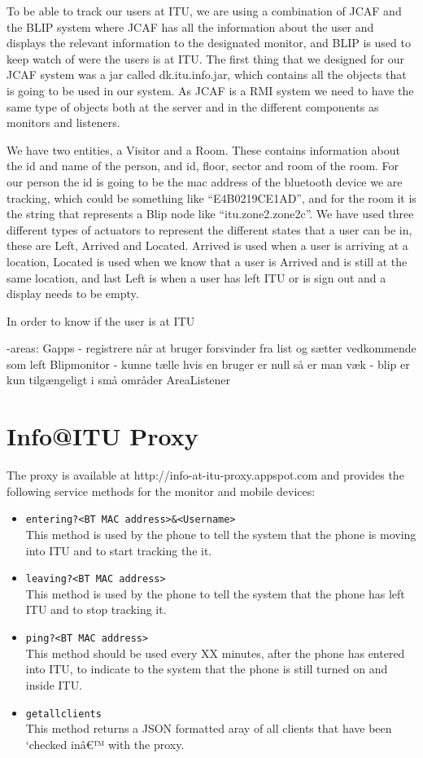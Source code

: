\documentclass{ubicomp2011}
\begin{document}
To be able to track our users at ITU, we are using a combination of JCAF and the BLIP system where JCAF has all the information about the user and displays the relevant information to the designated monitor, and BLIP is used to keep watch of were the users is at ITU.
The first thing that we designed for our JCAF system was a jar called dk.itu.info.jar, which contains all the objects that is going to be used in our system. As JCAF is a RMI system we need to have the same type of objects both at the server and in the different components as monitors and listeners.

We have two entities, a Visitor and a Room. These contains information about the id and name of the person, and id, floor, sector and room of the room. For our person the id is going to be the mac address of the bluetooth device we are tracking, which could be something like “E4B0219CE1AD”, and for the room it is the string that represents a Blip node like “itu.zone2.zone2c”.
We have used three different types of actuators to represent the different states that a user can be in, these are Left, Arrived and Located. Arrived is used when a user is arriving at a location, Located is used when we know that a user is Arrived and is still at the same location, and last Left is when a user has left ITU or is sign out and a display needs to be empty.

In order to know if the user is at ITU

-areas:
Gapps
- registrere når at bruger forsvinder fra list og sætter vedkommende som left
Blipmonitor
- kunne tælle hvis en bruger er null så er man væk
- blip er kun tilgængeligt i små områder
AreaListener
\section{Info@ITU Proxy}

The proxy is available at http://info-at-itu-proxy.appspot.com and provides the following service methods for the monitor and mobile devices:

\begin{itemize}
\item \texttt{entering?<BT MAC address>\&<Username>}\\
This method is used by the phone to tell the system that the phone is moving into ITU and to start tracking the it.
\item \texttt{leaving?<BT MAC address>}\\
This method is used by the phone to tell the system that the phone has left ITU and to stop tracking it.
\item \texttt{ping?<BT MAC address>}\\
This method should be used every XX minutes, after the phone has entered into ITU, to indicate to the system that the phone is still turned on and inside ITU.
\item \texttt{getallclients}\\
This method returns a JSON formatted aray of all clients that have been `checked inâ€™ with the proxy.
\end{itemize}
\end{document}
